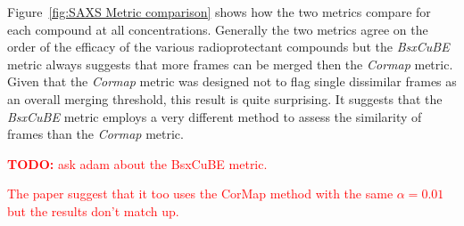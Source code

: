 Figure~\ref{fig:SAXS Metric comparison} shows how the two metrics compare for each compound at all concentrations.
Generally the two metrics agree on the order of the efficacy of the various radioprotectant compounds but the \textit{BsxCuBE} metric always suggests that more frames can be merged then the \textit{Cormap} metric.
Given that the \textit{Cormap} metric was designed not to flag single dissimilar frames as an overall merging threshold, this result is quite surprising.
It suggests that the \textit{BsxCuBE} metric employs a very different method to assess the similarity of frames than the \textit{Cormap} metric.
\textcolor{red}{
    \begin{myenumerate}
        \item \hypertarget{todo:Ask Adam about BsxCuBE}{\textbf{TODO:} ask adam about the BsxCuBE metric.}
        The paper suggest that it too uses the CorMap method with the same $\alpha = 0.01$ but the results don't match up.
    \end{myenumerate}
}

